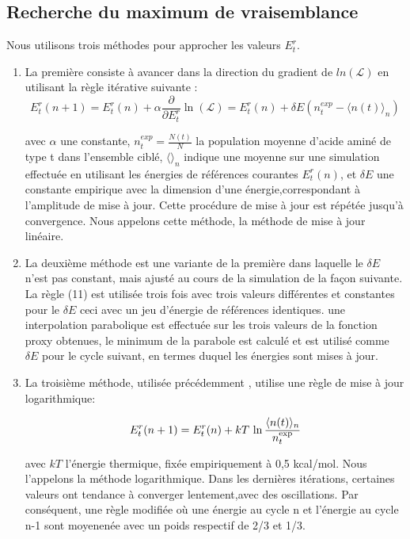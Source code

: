 \subsection{Recherche du maximum de vraisemblance}


Nous utilisons trois méthodes pour approcher les valeurs ${E^r_t}$.

\begin{enumerate}
\item La première consiste à avancer dans la direction du gradient de $ln(\mathcal{L})$ en utilisant la règle itérative suivante \cite{Kleinman06}:
\begin{equation} \label {eq: linear}
  E^r_t(n+1) = E^r_t(n) + \alpha \frac{\partial}{\partial E^r_t} \ln(\mathcal{L})=E^r_t(n) + \delta E (n^{exp}_t - \langle n(t)\rangle_n)
\end{equation} 

avec $\alpha$ une constante, $n^{exp}_t = \frac{N(t)}{N}$ la population moyenne d'acide aminé de type t dans l'ensemble ciblé,
$\langle\rangle_n$ indique une moyenne sur une simulation effectuée en utilisant les énergies de références courantes ${E^r_t(n)}$, et $\delta E$ une constante empirique avec la dimension d'une énergie,correspondant à l'amplitude de mise à jour. Cette procédure de mise à jour est répétée jusqu'à convergence. Nous appelons cette méthode, la méthode de mise à jour linéaire.

\item La deuxième méthode est une variante de la première dans laquelle le $\delta E$ n'est pas constant, mais ajusté au cours de la simulation de la façon suivante. La règle (11) est utilisée trois fois avec trois valeurs différentes et constantes pour le $\delta E$ ceci avec un jeu d'énergie de références identiques. une interpolation parabolique est effectuée sur les trois valeurs de la fonction proxy obtenues, le minimum de la parabole est calculé et est utilisé comme $\delta E$ pour le cycle suivant, en termes duquel les énergies sont mises à jour.

\item La troisième méthode, utilisée précédemment \cite{Schmidt08,Simonson13b}, utilise une règle de mise à jour logarithmique:

  \begin{equation} \label{eq:log}
E^r_t (n+1) = E^r_t (n) + kT \, \ln \frac{\langle n(t) \rangle_n}{n_t^{\rm exp}}
\end{equation}


  avec $kT$ l'énergie thermique, fixée empiriquement à 0,5 kcal/mol. Nous l'appelons la méthode logarithmique. Dans les dernières itérations, certaines valeurs ont tendance à converger lentement,avec des oscillations. Par conséquent, une règle modifiée où une énergie au cycle n et l'énergie au cycle  n-1 sont moyenenée avec un poids respectif de 2/3 et 1/3.

\end{enumerate}
 

